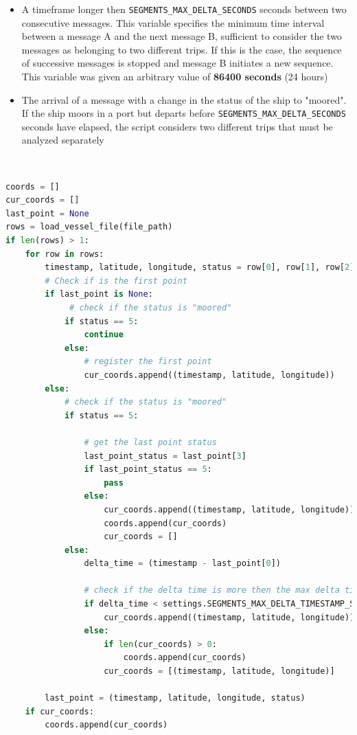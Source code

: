     \begin{itemize}
    
    \item A timeframe longer then \verb|SEGMENTS_MAX_DELTA_SECONDS| seconds between two consecutive messages. This variable specifies the minimum time interval between a message A and the next message B, sufficient to consider the two messages as belonging to two different trips. If this is the case, the sequence of successive messages is stopped and message B initiates a new sequence. This variable was given an arbitrary value of \textbf{86400 seconds} (24 hours)
    
    \item The arrival of a message with a change in the status of the ship to "moored". If the ship moors in a port but departs before \verb|SEGMENTS_MAX_DELTA_SECONDS| seconds have elapsed, the script considers two different trips that must be analyzed separately
    \end{itemize}
    \\
    \begin{minipage}{\linewidth}
    \begin{lstlisting}[language=Python]
coords = []
cur_coords = []
last_point = None
rows = load_vessel_file(file_path)
if len(rows) > 1:
    for row in rows:
        timestamp, latitude, longitude, status = row[0], row[1], row[2], row[3]
        # Check if is the first point
        if last_point is None:
             # check if the status is "moored"
            if status == 5:
                continue
            else:
                # register the first point
                cur_coords.append((timestamp, latitude, longitude))
        else:
            # check if the status is "moored"
            if status == 5:

                # get the last point status
                last_point_status = last_point[3]
                if last_point_status == 5:
                    pass
                else:
                    cur_coords.append((timestamp, latitude, longitude))
                    coords.append(cur_coords)
                    cur_coords = []
            else:
                delta_time = (timestamp - last_point[0])
                
                # check if the delta time is more then the max delta time
                if delta_time < settings.SEGMENTS_MAX_DELTA_TIMESTAMP_SECONDS:
                    cur_coords.append((timestamp, latitude, longitude))
                else:
                    if len(cur_coords) > 0:
                        coords.append(cur_coords)
                    cur_coords = [(timestamp, latitude, longitude)]

        last_point = (timestamp, latitude, longitude, status)
    if cur_coords:
        coords.append(cur_coords)
    \end{lstlisting}
    \end{minipage}

